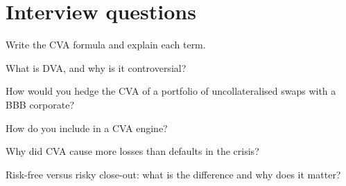 \section{Interview questions}

\begin{interviewq}\label{iq:rc:credit-and-debit-valuation-adjustments:1}
Write the CVA formula and explain each term.
\end{interviewq}

\begin{interviewq}\label{iq:rc:credit-and-debit-valuation-adjustments:2}
What is DVA, and why is it controversial?
\end{interviewq}

\begin{interviewq}\label{iq:rc:credit-and-debit-valuation-adjustments:3}
How would you hedge the CVA of a portfolio of uncollateralised swaps with a BBB corporate?
\end{interviewq}

\begin{interviewq}\label{iq:rc:credit-and-debit-valuation-adjustments:4}
How do you include  in a CVA engine?
\end{interviewq}

\begin{interviewq}\label{iq:rc:credit-and-debit-valuation-adjustments:5}
Why did CVA cause more losses than defaults in the crisis?
\end{interviewq}

\begin{interviewq}\label{iq:rc:credit-and-debit-valuation-adjustments:6}
Risk-free versus risky close-out: what is the difference and why does it matter?
\end{interviewq}
